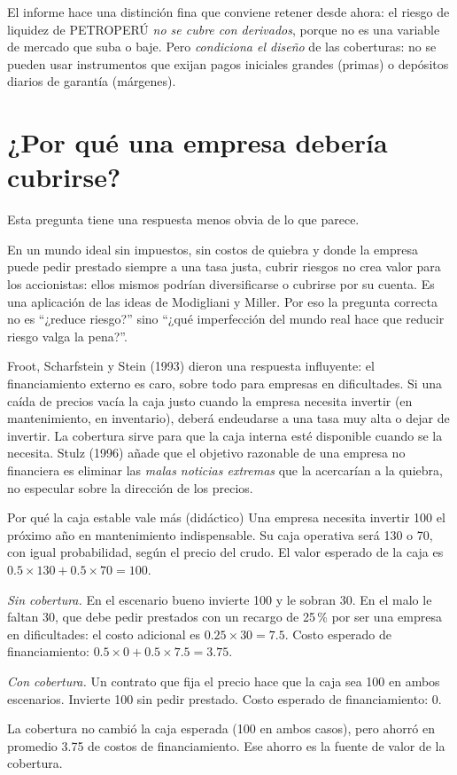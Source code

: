 \begin{importante}
El informe hace una distinción fina que conviene retener desde ahora: el riesgo de liquidez de PETROPERÚ \emph{no se cubre con derivados}, porque no es una variable de mercado que suba o baje. Pero \emph{condiciona el diseño} de las coberturas: no se pueden usar instrumentos que exijan pagos iniciales grandes (primas) o depósitos diarios de garantía (márgenes).
\end{importante}

\section{¿Por qué una empresa debería cubrirse?}

Esta pregunta tiene una respuesta menos obvia de lo que parece.

\begin{adicional}
En un mundo ideal sin impuestos, sin costos de quiebra y donde la empresa puede pedir prestado siempre a una tasa justa, cubrir riesgos no crea valor para los accionistas: ellos mismos podrían diversificarse o cubrirse por su cuenta. Es una aplicación de las ideas de Modigliani y Miller. Por eso la pregunta correcta no es \enquote{¿reduce riesgo?} sino \enquote{¿qué imperfección del mundo real hace que reducir riesgo valga la pena?}.
\end{adicional}

Froot, Scharfstein y Stein (1993) dieron una respuesta influyente: el financiamiento externo es caro, sobre todo para empresas en dificultades. Si una caída de precios vacía la caja justo cuando la empresa necesita invertir (en mantenimiento, en inventario), deberá endeudarse a una tasa muy alta o dejar de invertir. La cobertura sirve para que la caja interna esté disponible cuando se la necesita. Stulz (1996) añade que el objetivo razonable de una empresa no financiera es eliminar las \emph{malas noticias extremas} que la acercarían a la quiebra, no especular sobre la dirección de los precios.

\begin{ejemplo}{Por qué la caja estable vale más (didáctico)}
Una empresa necesita invertir 100 el próximo año en mantenimiento indispensable. Su caja operativa será 130 o 70, con igual probabilidad, según el precio del crudo. El valor esperado de la caja es $0.5\times130+0.5\times70=100$.

\emph{Sin cobertura.} En el escenario bueno invierte 100 y le sobran 30. En el malo le faltan 30, que debe pedir prestados con un recargo de 25\,\% por ser una empresa en dificultades: el costo adicional es $0.25\times30=7.5$. Costo esperado de financiamiento: $0.5\times 0+0.5\times7.5=3.75$.

\emph{Con cobertura.} Un contrato que fija el precio hace que la caja sea 100 en ambos escenarios. Invierte 100 sin pedir prestado. Costo esperado de financiamiento: 0.

La cobertura no cambió la caja esperada (100 en ambos casos), pero ahorró en promedio 3.75 de costos de financiamiento. Ese ahorro es la fuente de valor de la cobertura.
\end{ejemplo}

